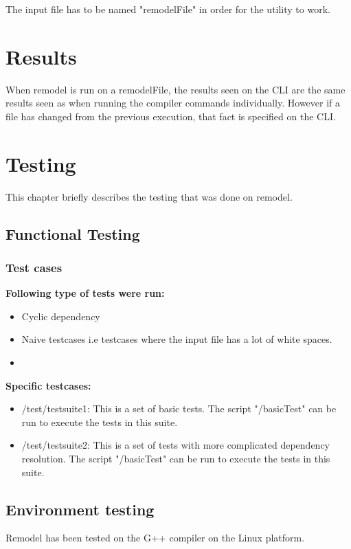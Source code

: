 \documentclass[a4paper, 12pt, notitlepage]{report}
\begin{document}
The input file has to be named "remodelFile" in order for the utility to work.

\chapter{Results}
%
When remodel is run on a remodelFile, the results seen on the CLI are the same results seen as when running the compiler commands individually. However if a file has changed from the previous execution, that fact is specified on the CLI.

\chapter{Testing}
%
This chapter briefly describes the testing that was done on remodel.

\section{Functional Testing}
\subsection{Test cases}
\textbf{Following type of tests were run:}
\begin{itemize}
\item Cyclic dependency
\item Naive testcases i.e testcases where the input file has a lot of white spaces.
\item 
\end{itemize}

\textbf{Specific testcases:}
\begin{itemize}
\item /test/testsuite1: This is a set of basic tests. The script "/basicTest" can be run to execute the tests in this suite.
\item /test/testsuite2: This is a set of tests with more complicated dependency resolution. The script "/basicTest" can be run to execute the tests in this suite.
\end{itemize}

\section{Environment testing}
Remodel has been tested on the G++ compiler on the Linux platform.

\end{document}

